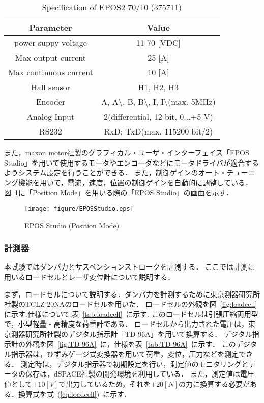 \documentclass[a4paper,12pt]{article_vdlab_sotsuron}
\begin{document}
\vspace*{10mm}
\begin{table}[h]
  \begin{center}
    \caption{Specification of EPOS2 70/10 (375711)}
    \label{tab:Motor_driver}
    \begin{tabular}{cc}\hline
      Parameter & Value \\\hline
      power suppy voltage & 11-70 [VDC] \\
      Max output current & 25 [A] \\
      Max continuous current & 10 [A] \\
      Hall sensor & H1, H2, H3 \\
      Encoder & A, A$\setminus$, B, B$\setminus$, I, I$\setminus$(max. 5MHz)\\
      Analog Input & 2(differential, 12-bit, 0...+5 V)\\
      RS232 & RxD; TxD(max. 115200 bit/2) \\\hline
    \end{tabular}
  \end{center}
\end{table}


\newpage
また，maxon motor社製のグラフィカル・ユーザ・インターフェイス「EPOS Studio」を用いて使用するモータやエンコーダなどにモータドライバが適合するようシステム設定を行うことができる\cite{maxon}．
また，制御ゲインのオート・チューニング機能を用いて，電流，速度，位置の制御ゲインを自動的に調整している．
図~\ref{fig:studio}に「Position Mode」を用いる際の「EPOS Studio」の画面を示す．

\vspace*{10mm}
\begin{figure}[h]
  \begin{center}
    \texttt{[image: figure/EPOSStudio.eps]}
     \vspace*{5mm}
     \caption{EPOS Studio (Position Mode)}
     \label{fig:studio}
  \end{center}
\end{figure}


\newpage
\subsubsection{計測器}
本試験ではダンパ力とサスペンションストロークを計測する．
ここでは計測に用いるロードセルとレーザ変位計について説明する．
\par
まず，ロードセルについて説明する．ダンパ力を計測するために東京測器研究所社製のTCLZ-20NAのロードセルを用いた．
ロードセルの外観を図~\ref{fig:loadcell}に示す.仕様について,表~\ref{tab:loadcell}~に示す.
このロードセルは引張圧縮両用型で，小型軽量・高精度な荷重計である．
ロードセルから出力された電圧は，東京測器研究所社製のデジタル指示計「TD-96A」を用いて換算する．
デジタル指示計の外観を図~\ref{fig:TD-96A}~に，仕様を表~\ref{tab:TD-96A}~に示す．
このデジタル指示器は，ひずみゲージ式変換器を用いて荷重，変位，圧力などを測定できる．
測定時は，デジタル指示器で初期設定を行い，測定値のモニタリングとデータの保存は，dSPACE社製の開発環境を利用している．
また，測定値は電圧値として$\pm{10}[V]$で出力しているため，それを$\pm{20}[N]$の力に換算する必要がある．換算式を式~(\ref{eq:loadcell})~に示す．
\end{document}
